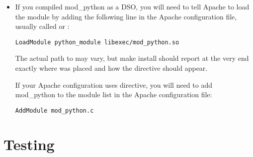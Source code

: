 \begin{itemize}

\item
If you compiled mod_python as a DSO, you will need to tell Apache to
load the module by adding the following line in the Apache
configuration file, usually called  or
:

\begin{verbatim}
LoadModule python_module libexec/mod_python.so
\end{verbatim}

The actual path to  may vary, but make install
should report at the very end exactly where 
was placed and how the  directive should appear.

If your Apache configuration uses  directive,
you will need to add mod_python to the module list in the Apache
configuration file:

\begin{verbatim}
AddModule mod_python.c
\end{verbatim}


                            


\end{itemize}

\section{Testing\label{inst-testing}}


